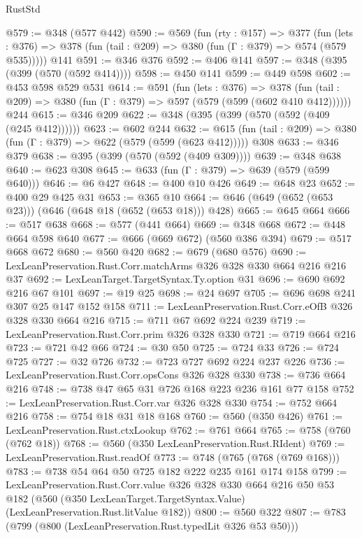 \begin{lexlean}{RustStd}
\begin{coremodule}
{\begin{coremodule}
{{{{{@579 := @348 (@577 @442)
@590 := @569
    (fun (rty : @157) =>
    @377
      (fun (lets : @376) => @378 (fun (tail : @209) => @380 (fun (Γ : @379) => @574 (@579 @535)))))
    @141
@591 := @346 @376
@592 := @406 @141
@597 := @348 (@395 (@399 (@570 (@592 @414))))
@598 := @450 @141
@599 := @449 @598
@602 := @453 @598 @529 @531
@614 := @591
    (fun (lets : @376) =>
    @378 (fun (tail : @209) => @380 (fun (Γ : @379) => @597 (@579 (@599 (@602 @410 @412))))))
    @244
@615 := @346 @209
@622 := @348 (@395 (@399 (@570 (@592 (@409 (@245 @412))))))
@623 := @602 @244
@632 := @615 (fun (tail : @209) => @380 (fun (Γ : @379) => @622 (@579 (@599 (@623 @412))))) @308
@633 := @346 @379
@638 := @395 (@399 (@570 (@592 (@409 @309))))
@639 := @348 @638
@640 := @623 @308
@645 := @633 (fun (Γ : @379) => @639 (@579 (@599 @640)))
@646 := @6 @427
@648 := @400 @10 @426
@649 := @648 @23
@652 := @400 @29 @425 @31
@653 := @365 @10
@664 := @646 (@649 (@652 (@653 @23))) (@646 (@648 @18 (@652 (@653 @18))) @428)
@665 := @645 @664
@666 := @517 @638
@668 := @577 (@441 @664)
@669 := @348 @668
@672 := @448 @664 @598 @640
@677 := @666 (@669 @672) (@560 @386 @394)
@679 := @517 @668 @672
@680 := @560 @420
@682 := @679 (@680 @576)
@690 := LexLeanPreservation.Rust.Corr.matchArms @326 @328 @330 @664 @216 @216 @37
@692 := LexLeanTarget.TargetSyntax.Ty.option @31
@696 := @690 @692 @216 @67 @101
@697 := @19 @25
@698 := @24 @697
@705 := @696 @698 @241 @307 @25 @147 @152 @158
@711 := LexLeanPreservation.Rust.Corr.eOfB @326 @328 @330 @664 @216
@715 := @711 @67 @692 @224 @239
@719 := LexLeanPreservation.Rust.Corr.prim @326 @328 @330
@721 := @719 @664 @216
@723 := @721 @42 @66
@724 := @30 @50
@725 := @724 @33
@726 := @724 @725
@727 := @32 @726
@732 := @723 @727 @692 @224 @237 @226
@736 := LexLeanPreservation.Rust.Corr.opsCons @326 @328 @330
@738 := @736 @664 @216
@748 := @738 @47 @65 @31 @726 @168 @223 @236 @161 @77 @158
@752 := LexLeanPreservation.Rust.Corr.var @326 @328 @330
@754 := @752 @664 @216
@758 := @754 @18 @31 @18 @168
@760 := @560 (@350 @426)
@761 := LexLeanPreservation.Rust.ctxLookup
@762 := @761 @664
@765 := @758 (@760 (@762 @18))
@768 := @560 (@350 LexLeanPreservation.Rust.RIdent)
@769 := LexLeanPreservation.Rust.readOf
@773 := @748 (@765 (@768 (@769 @168)))
@783 := @738 @54 @64 @50 @725 @182 @222 @235 @161 @174 @158
@799 := LexLeanPreservation.Rust.Corr.value
    @326
    @328
    @330
    @664
    @216
    @50
    @53
    @182
    (@560 (@350 LexLeanTarget.TargetSyntax.Value) (LexLeanPreservation.Rust.litValue @182))
@800 := @560 @322
@807 := @783 (@799 (@800 (LexLeanPreservation.Rust.typedLit @326 @53 @50)))
}}}}}
\end{coremodule}}
\end{coremodule}
\end{lexlean}
